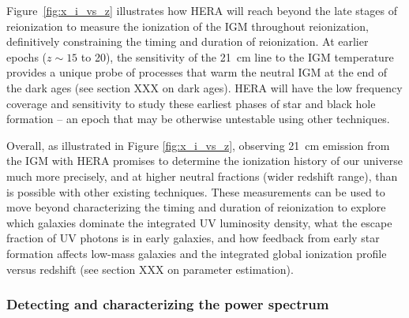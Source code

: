 \documentclass[preprint]{aastex}
\begin{document}
Figure~\ref{fig:x_i_vs_z} illustrates how HERA will
reach beyond the late stages of reionization to measure the
ionization of the IGM throughout reionization, definitively constraining the timing
and duration of reionization.  At earlier epochs ($z \sim 15$ to 20), the sensitivity of the 21~cm line 
to the IGM temperature provides a unique probe of processes that warm the neutral IGM at the
end of the dark ages (see section XXX on dark ages).  HERA will have the low frequency coverage and
sensitivity to study these earliest phases of star and black hole formation -- an epoch that may be otherwise
untestable using other techniques.

Overall, as illustrated in Figure \ref{fig:x_i_vs_z}, observing 21~cm emission from the IGM with HERA 
promises to determine the ionization history of our universe much more precisely,
and at higher neutral fractions (wider redshift range), than is possible with other existing techniques.  These measurements can
be used to move beyond characterizing the timing and duration of reionization to
explore which galaxies dominate the integrated UV luminosity density, what the escape fraction
of UV photons is in early galaxies, and how feedback from early star formation affects low-mass galaxies and 
the integrated  global ionization profile versus redshift (see section XXX on parameter estimation). 

\subsubsection{Detecting and characterizing the power spectrum}
\label{sec:detectPspec}
\end{document}

